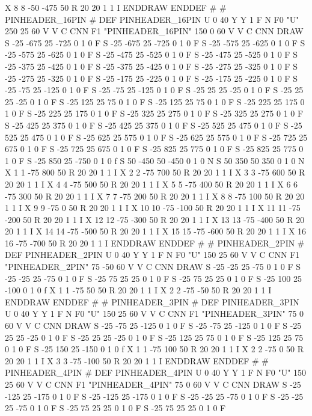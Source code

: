 X 8 8 -50 -475 50 R 20 20 1 1 I
ENDDRAW
ENDDEF
#
# PINHEADER_16PIN
#
DEF PINHEADER_16PIN U 0 40 Y Y 1 F N
F0 "U" 250 25 60 V V C CNN
F1 "PINHEADER_16PIN" 150 0 60 V V C CNN
DRAW
S -25 -675 25 -725 0 1 0 F
S -25 -675 25 -725 0 1 0 F
S -25 -575 25 -625 0 1 0 F
S -25 -575 25 -625 0 1 0 F
S -25 -475 25 -525 0 1 0 F
S -25 -475 25 -525 0 1 0 F
S -25 -375 25 -425 0 1 0 F
S -25 -375 25 -425 0 1 0 F
S -25 -275 25 -325 0 1 0 F
S -25 -275 25 -325 0 1 0 F
S -25 -175 25 -225 0 1 0 F
S -25 -175 25 -225 0 1 0 F
S -25 -75 25 -125 0 1 0 F
S -25 -75 25 -125 0 1 0 F
S -25 25 25 -25 0 1 0 F
S -25 25 25 -25 0 1 0 F
S -25 125 25 75 0 1 0 F
S -25 125 25 75 0 1 0 F
S -25 225 25 175 0 1 0 F
S -25 225 25 175 0 1 0 F
S -25 325 25 275 0 1 0 F
S -25 325 25 275 0 1 0 F
S -25 425 25 375 0 1 0 F
S -25 425 25 375 0 1 0 F
S -25 525 25 475 0 1 0 F
S -25 525 25 475 0 1 0 F
S -25 625 25 575 0 1 0 F
S -25 625 25 575 0 1 0 F
S -25 725 25 675 0 1 0 F
S -25 725 25 675 0 1 0 F
S -25 825 25 775 0 1 0 F
S -25 825 25 775 0 1 0 F
S -25 850 25 -750 0 1 0 f
S 50 -450 50 -450 0 1 0 N
S 50 350 50 350 0 1 0 N
X 1 1 -75 800 50 R 20 20 1 1 I
X 2 2 -75 700 50 R 20 20 1 1 I
X 3 3 -75 600 50 R 20 20 1 1 I
X 4 4 -75 500 50 R 20 20 1 1 I
X 5 5 -75 400 50 R 20 20 1 1 I
X 6 6 -75 300 50 R 20 20 1 1 I
X 7 7 -75 200 50 R 20 20 1 1 I
X 8 8 -75 100 50 R 20 20 1 1 I
X 9 9 -75 0 50 R 20 20 1 1 I
X 10 10 -75 -100 50 R 20 20 1 1 I
X 11 11 -75 -200 50 R 20 20 1 1 I
X 12 12 -75 -300 50 R 20 20 1 1 I
X 13 13 -75 -400 50 R 20 20 1 1 I
X 14 14 -75 -500 50 R 20 20 1 1 I
X 15 15 -75 -600 50 R 20 20 1 1 I
X 16 16 -75 -700 50 R 20 20 1 1 I
ENDDRAW
ENDDEF
#
# PINHEADER_2PIN
#
DEF PINHEADER_2PIN U 0 40 Y Y 1 F N
F0 "U" 150 25 60 V V C CNN
F1 "PINHEADER_2PIN" 75 -50 60 V V C CNN
DRAW
S -25 -25 25 -75 0 1 0 F
S -25 -25 25 -75 0 1 0 F
S -25 75 25 25 0 1 0 F
S -25 75 25 25 0 1 0 F
S -25 100 25 -100 0 1 0 f
X 1 1 -75 50 50 R 20 20 1 1 I
X 2 2 -75 -50 50 R 20 20 1 1 I
ENDDRAW
ENDDEF
#
# PINHEADER_3PIN
#
DEF PINHEADER_3PIN U 0 40 Y Y 1 F N
F0 "U" 150 25 60 V V C CNN
F1 "PINHEADER_3PIN" 75 0 60 V V C CNN
DRAW
S -25 -75 25 -125 0 1 0 F
S -25 -75 25 -125 0 1 0 F
S -25 25 25 -25 0 1 0 F
S -25 25 25 -25 0 1 0 F
S -25 125 25 75 0 1 0 F
S -25 125 25 75 0 1 0 F
S -25 150 25 -150 0 1 0 f
X 1 1 -75 100 50 R 20 20 1 1 I
X 2 2 -75 0 50 R 20 20 1 1 I
X 3 3 -75 -100 50 R 20 20 1 1 I
ENDDRAW
ENDDEF
#
# PINHEADER_4PIN
#
DEF PINHEADER_4PIN U 0 40 Y Y 1 F N
F0 "U" 150 25 60 V V C CNN
F1 "PINHEADER_4PIN" 75 0 60 V V C CNN
DRAW
S -25 -125 25 -175 0 1 0 F
S -25 -125 25 -175 0 1 0 F
S -25 -25 25 -75 0 1 0 F
S -25 -25 25 -75 0 1 0 F
S -25 75 25 25 0 1 0 F
S -25 75 25 25 0 1 0 F
